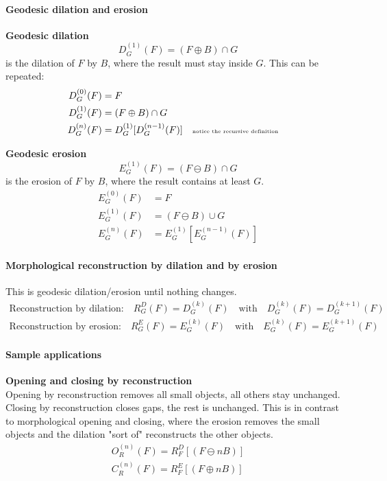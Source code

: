 \paragraph{Geodesic dilation and erosion}
\textbf{Geodesic dilation}
\[
	D_G^{(1)}(F) = (F\oplus B)\cap G
\]
is the dilation of $F$ by $B$, where the result must stay inside $G$.
This can be repeated:
\begin{align*}
	D_G^{(0)}(F) &= F \\
	D_G^{(1)}(F) &= (F\oplus B)\cap G\\
	D_G^{(n)}(F) &= D_G^{(1)}[D_G^{(n-1)}(F)]	&& \text{\tiny notice the recursive definition}
\end{align*}

\textbf{Geodesic erosion}
	\[
		E_G^{(1)}(F) = (F \ominus B) \cap G
	\]
is the erosion of $F$ by $B$, where the result contains at least $G$.
\begin{align*}
  E_G^{(0)}(F) &= F \\
	E_G^{(1)}(F) &= (F\ominus B)\cup G \\
	E_G^{(n)}(F) &= E_G^{(1)}[E_G^{(n-1)}(F)]
\end{align*}

\paragraph{Morphological reconstruction by dilation and by erosion}
This is geodesic dilation/erosion until nothing changes.
\begin{align*}
    \text{Reconstruction by dilation:} \quad R_G^D(F)=D_G^{(k)}(F) \quad \text{with} \quad D_G^{(k)}(F)=D_G^{(k+1)}(F)\\
    \text{Reconstruction by erosion:} \quad R_G^E(F)=E_G^{(k)}(F) \quad \text{with} \quad E_G^{(k)}(F)=E_G^{(k+1)}(F)
\end{align*}

\paragraph{Sample applications}
\textbf{Opening and closing by reconstruction}\\
Opening by reconstruction removes all small objects, all others stay unchanged.
Closing by reconstruction closes gaps, the rest is unchanged. This is in contrast to morphological opening and closing, where the erosion removes the small objects and the dilation "sort of" reconstructs the other objects.\\
\begin{align*}
O_R^{(n)}(F)=R_F^D[(F\ominus nB)]\\
C_R^{(n)}(F)=R_F^E[(F\oplus nB)]
\end{align*}

